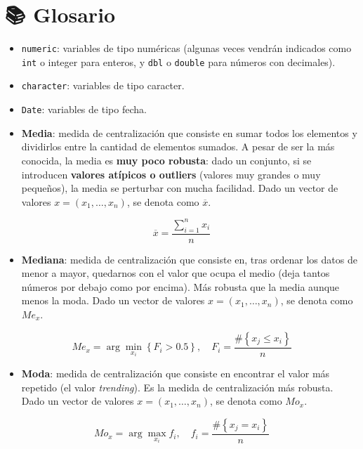 \documentclass[11pt,]{book}
\providecommand{\tightlist}{%
  \setlength{\itemsep}{0pt}\setlength{\parskip}{0pt}}
\begin{document}
\hypertarget{glosario3}{%
\section{📚 Glosario}\label{glosario3}}

\begin{itemize}
\item
  \texttt{numeric}: variables de tipo numéricas (algunas veces vendrán indicados como \texttt{int} o integer para enteros, y \texttt{dbl} o \texttt{double} para números con decimales).
\item
  \texttt{character}: variables de tipo caracter.
\item
  \texttt{Date}: variables de tipo fecha.
\item
  \textbf{Media}: medida de centralización que consiste en sumar todos los elementos y dividirlos entre la cantidad de elementos sumados. A pesar de ser la más conocida, la media es \textbf{muy poco robusta}: dado un conjunto, si se introducen \textbf{valores atípicos o outliers} (valores muy grandes o muy pequeños), la media se perturbar con mucha facilidad. Dado un vector de valores \(x = (x_1, \ldots, x_n)\), se denota como \(\overline{x}\).
\end{itemize}

\[\overline{x} = \frac{\displaystyle \sum_{i=1}^{n}x_i}{n}\]

\begin{itemize}
\tightlist
\item
  \textbf{Mediana}: medida de centralización que consiste en, tras ordenar los datos de menor a mayor, quedarnos con el valor que ocupa el medio (deja tantos números por debajo como por encima). Más robusta que la media aunque menos la moda. Dado un vector de valores \(x = (x_1, \ldots, x_n)\), se denota como \(Me_x\).
\end{itemize}

\[Me_x = \displaystyle \arg \min_{x_i} \left\lbrace F_i > 0.5 \right\rbrace, \quad F_i = \frac{\#\left\lbrace x_j \leq x_i \right\rbrace}{n}\]

\begin{itemize}
\tightlist
\item
  \textbf{Moda}: medida de centralización que consiste en encontrar el valor más repetido (el valor \emph{trending}). Es la medida de centralización más robusta. Dado un vector de valores \(x = (x_1, \ldots, x_n)\), se denota como \(Mo_x\).
\end{itemize}

\[Mo_x = \displaystyle \arg \max_{x_i} f_i  , \quad f_i = \frac{\#\left\lbrace x_j = x_i \right\rbrace}{n}\]
\end{document}
